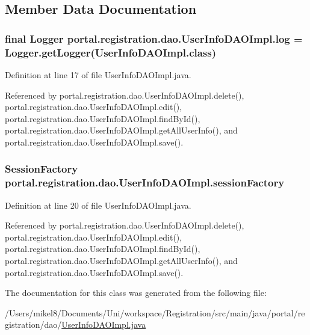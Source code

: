 \subsection{Member Data Documentation}
\hypertarget{classportal_1_1registration_1_1dao_1_1UserInfoDAOImpl_a8538048dabb08e33db0ab72827bb0e9a}{
\subsubsection[{log}]{\setlength{\rightskip}{0pt plus 5cm}final Logger {\bf portal.registration.dao.UserInfoDAOImpl.log} = Logger.getLogger(UserInfoDAOImpl.class)}}
\label{classportal_1_1registration_1_1dao_1_1UserInfoDAOImpl_a8538048dabb08e33db0ab72827bb0e9a}


Definition at line 17 of file UserInfoDAOImpl.java.



Referenced by portal.registration.dao.UserInfoDAOImpl.delete(), portal.registration.dao.UserInfoDAOImpl.edit(), portal.registration.dao.UserInfoDAOImpl.findById(), portal.registration.dao.UserInfoDAOImpl.getAllUserInfo(), and portal.registration.dao.UserInfoDAOImpl.save().

\hypertarget{classportal_1_1registration_1_1dao_1_1UserInfoDAOImpl_adf05657df384ecaac7c13700eae7fd9e}{
\subsubsection[{sessionFactory}]{\setlength{\rightskip}{0pt plus 5cm}SessionFactory {\bf portal.registration.dao.UserInfoDAOImpl.sessionFactory}}}
\label{classportal_1_1registration_1_1dao_1_1UserInfoDAOImpl_adf05657df384ecaac7c13700eae7fd9e}


Definition at line 20 of file UserInfoDAOImpl.java.



Referenced by portal.registration.dao.UserInfoDAOImpl.delete(), portal.registration.dao.UserInfoDAOImpl.edit(), portal.registration.dao.UserInfoDAOImpl.findById(), portal.registration.dao.UserInfoDAOImpl.getAllUserInfo(), and portal.registration.dao.UserInfoDAOImpl.save().



The documentation for this class was generated from the following file:\begin{DoxyCompactItemize}
\item 
/Users/mikel8/Documents/Uni/workspace/Registration/src/main/java/portal/registration/dao/\hyperlink{UserInfoDAOImpl_8java}{UserInfoDAOImpl.java}\end{DoxyCompactItemize}
